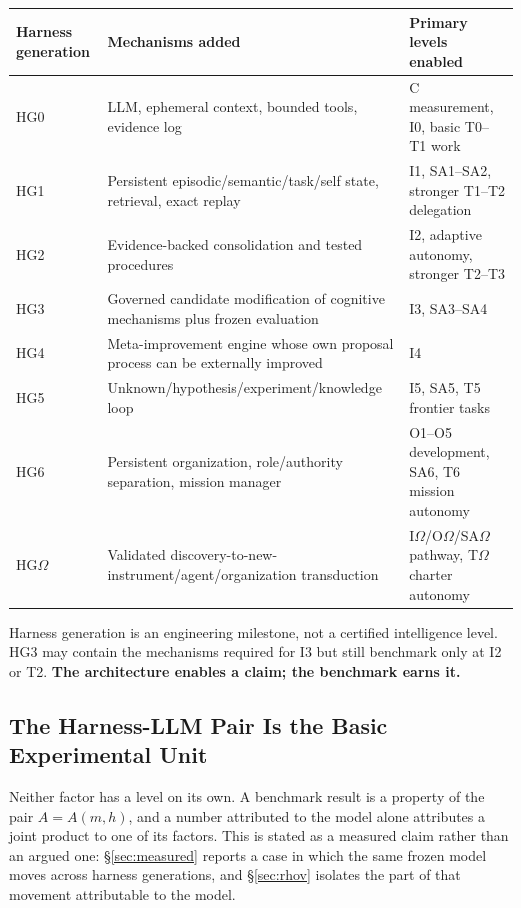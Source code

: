 \documentclass[11pt]{article}
\theoremstyle{definition}
\newcommand{\Om}{\ensuremath{\Omega}}
\begin{document}
\begin{table}[h]
\centering\small
\begin{tabularx}{\textwidth}{@{}lYY@{}}
\toprule
Harness generation & Mechanisms added & Primary levels enabled \\
\midrule
HG0 & LLM, ephemeral context, bounded tools, evidence log & C measurement, I0, basic T0--T1 work \\
HG1 & Persistent episodic/semantic/task/self state, retrieval, exact replay & I1, SA1--SA2, stronger T1--T2 delegation \\
HG2 & Evidence-backed consolidation and tested procedures & I2, adaptive autonomy, stronger T2--T3 \\
HG3 & Governed candidate modification of cognitive mechanisms plus frozen evaluation & I3, SA3--SA4 \\
HG4 & Meta-improvement engine whose own proposal process can be externally improved & I4 \\
HG5 & Unknown/hypothesis/experiment/knowledge loop & I5, SA5, T5 frontier tasks \\
HG6 & Persistent organization, role/authority separation, mission manager & O1--O5 development, SA6, T6 mission autonomy \\
HG\Om{} & Validated discovery-to-new-instrument/agent/organization transduction & I\Om{}/O\Om{}/SA\Om{} pathway, T\Om{} charter autonomy \\
\bottomrule
\end{tabularx}
\end{table}

Harness generation is an engineering milestone, not a certified intelligence level. HG3 may contain the mechanisms required for I3 but still benchmark only at I2 or T2. \textbf{The architecture enables a claim; the benchmark earns it.}

\subsection{The Harness-LLM Pair Is the Basic Experimental Unit}\label{sec:pair}

Neither factor has a level on its own. A benchmark result is a property of the pair $A = A(m,h)$, and a number attributed to the model alone attributes a joint product to one of its factors. This is stated as a measured claim rather than an argued one: \S\ref{sec:measured} reports a case in which the same frozen model moves across harness generations, and \S\ref{sec:rhov} isolates the part of that movement attributable to the model.
\end{document}
